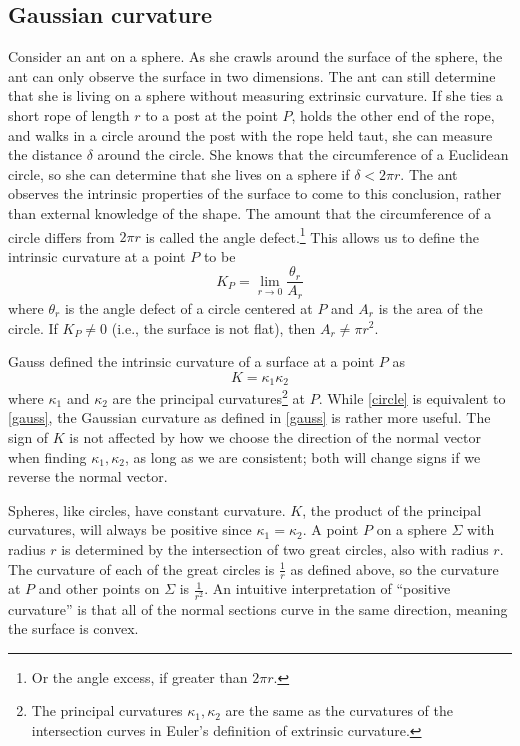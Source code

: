 \documentclass[letterpaper,titlepage]{article}
\begin{document}
\subsection{Gaussian curvature}
Consider an ant on a sphere.
As she crawls around the surface of the sphere, the ant can only observe the surface in two dimensions.
The ant can still determine that she is living on a sphere without measuring extrinsic curvature.
If she ties a short rope of length $r$ to a post at the point $P$, holds the other end of the rope, and walks in a circle around the post with the rope held taut, she can measure the distance $\delta$ around the circle.
She knows that the circumference of a Euclidean circle, so she can determine that she lives on a sphere if $\delta < 2\pi r$.\cite{adventures}
The ant observes the intrinsic properties of the surface to come to this conclusion, rather than external knowledge of the shape.
The amount that the circumference of a circle differs from $2\pi r$ is called the angle defect.\footnote{Or the angle excess, if greater than $2\pi r$.}
This allows us to define the intrinsic curvature at a point $P$ to be
\begin{equation}
K_P = \lim_{r \to 0} \frac{\theta_r}{A_r}
\label{circle}
\end{equation}
where $\theta_r$ is the angle defect of a circle centered at $P$ and $A_r$ is the area of the circle.
If $K_P \not= 0$ (i.e., the surface is not flat), then $A_r \not= \pi r^2$.\cite{makingmath}

Gauss defined the intrinsic curvature of a surface at a point $P$ as
\begin{equation}
K = \kappa_1\kappa_2
\label{gauss}
\end{equation}
where $\kappa_1$ and $\kappa_2$ are the principal curvatures\footnote{The principal curvatures $\kappa_1,\kappa_2$ are the same as the curvatures of the intersection curves in Euler's definition of extrinsic curvature.} at $P$.\cite{gauss}
While \eqref{circle} is equivalent to \eqref{gauss}, the Gaussian curvature as defined in \eqref{gauss} is rather more useful.
The sign of $K$ is not affected by how we choose the direction of the normal vector when finding $\kappa_1,\kappa_2$, as long as we are consistent; both will change signs if we reverse the normal vector.

Spheres, like circles, have constant curvature.
$K$, the product of the principal curvatures, will always be positive since $\kappa_1 = \kappa_2$.
A point $P$ on a sphere $\Sigma$ with radius $r$ is determined by the intersection of two great circles, also with radius $r$.
The curvature of each of the great circles is $\frac{1}{r}$ as defined above, so the curvature at $P$ and other points on $\Sigma$ is $\frac{1}{r^2}$.
An intuitive interpretation of ``positive curvature'' is that all of the normal sections curve in the same direction, meaning the surface is convex.\cite{singer}
\end{document}
